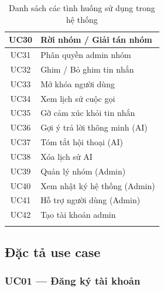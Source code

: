 \documentclass[12pt,a4paper]{report}
\begin{document}
\begin{longtable}{|c|p{11cm}|}
    \hline
    UC30 & Rời nhóm / Giải tán nhóm \\
    \hline
    UC31 & Phân quyền admin nhóm \\
    \hline
    UC32 & Ghim / Bỏ ghim tin nhắn \\
    \hline
    UC33 & Mở khóa người dùng \\
    \hline
    UC34 & Xem lịch sử cuộc gọi \\
    \hline
    UC35 & Gỡ cảm xúc khỏi tin nhắn \\
    \hline
    UC36 & Gợi ý trả lời thông minh (AI) \\
    \hline
    UC37 & Tóm tắt hội thoại (AI) \\
    \hline
    UC38 & Xóa lịch sử AI \\
    \hline
    UC39 & Quản lý nhóm (Admin) \\
    \hline
    UC40 & Xem nhật ký hệ thống (Admin) \\
    \hline
    UC41 & Hỗ trợ người dùng (Admin) \\
    \hline
    UC42 & Tạo tài khoản admin \\
    \hline
    \caption{Danh sách các tình huống sử dụng trong hệ thống}
\end{longtable}

\subsection{Đặc tả use case}

\subsubsection{UC01 --- Đăng ký tài khoản}
\end{document}
